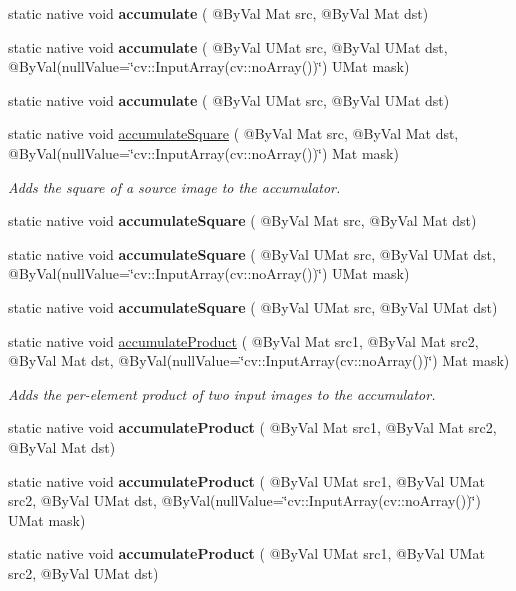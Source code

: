 \begin{DoxyCompactItemize}
\item 
static native void {\bfseries accumulate} ( @By\+Val Mat src, @By\+Val Mat dst)
\item 
static native void {\bfseries accumulate} ( @By\+Val U\+Mat src, @By\+Val U\+Mat dst, @By\+Val(null\+Value=\char`\"{}cv\+::\+Input\+Array(cv\+::no\+Array())\char`\"{}) U\+Mat mask)
\item 
static native void {\bfseries accumulate} ( @By\+Val U\+Mat src, @By\+Val U\+Mat dst)
\item 
static native void \hyperlink{group__imgproc__motion_ga84b3439df65475bcccdee5cd99171da8}{accumulate\+Square} ( @By\+Val Mat src, @By\+Val Mat dst, @By\+Val(null\+Value=\char`\"{}cv\+::\+Input\+Array(cv\+::no\+Array())\char`\"{}) Mat mask)
\begin{DoxyCompactList}\small\item\em Adds the square of a source image to the accumulator. \end{DoxyCompactList}\item 
static native void {\bfseries accumulate\+Square} ( @By\+Val Mat src, @By\+Val Mat dst)
\item 
static native void {\bfseries accumulate\+Square} ( @By\+Val U\+Mat src, @By\+Val U\+Mat dst, @By\+Val(null\+Value=\char`\"{}cv\+::\+Input\+Array(cv\+::no\+Array())\char`\"{}) U\+Mat mask)
\item 
static native void {\bfseries accumulate\+Square} ( @By\+Val U\+Mat src, @By\+Val U\+Mat dst)
\item 
static native void \hyperlink{group__imgproc__motion_ga651a79607dc72d0697ca3dc5df6e9033}{accumulate\+Product} ( @By\+Val Mat src1, @By\+Val Mat src2, @By\+Val Mat dst, @By\+Val(null\+Value=\char`\"{}cv\+::\+Input\+Array(cv\+::no\+Array())\char`\"{}) Mat mask)
\begin{DoxyCompactList}\small\item\em Adds the per-\/element product of two input images to the accumulator. \end{DoxyCompactList}\item 
static native void {\bfseries accumulate\+Product} ( @By\+Val Mat src1, @By\+Val Mat src2, @By\+Val Mat dst)
\item 
static native void {\bfseries accumulate\+Product} ( @By\+Val U\+Mat src1, @By\+Val U\+Mat src2, @By\+Val U\+Mat dst, @By\+Val(null\+Value=\char`\"{}cv\+::\+Input\+Array(cv\+::no\+Array())\char`\"{}) U\+Mat mask)
\item 
static native void {\bfseries accumulate\+Product} ( @By\+Val U\+Mat src1, @By\+Val U\+Mat src2, @By\+Val U\+Mat dst)

\end{DoxyCompactItemize}

